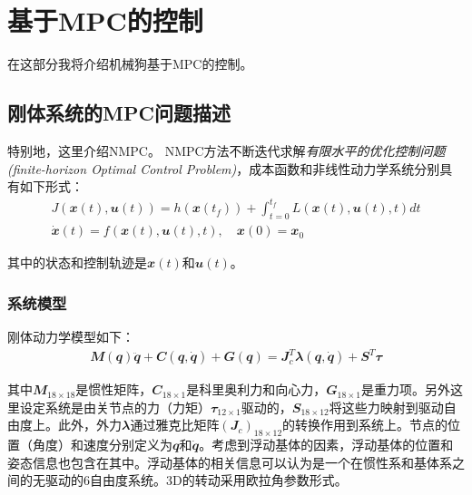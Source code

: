 
\chapter[基于MPC的控制]{基于MPC的控制}


在这部分我将介绍机械狗基于MPC的控制。

\section[刚体系统的MPC问题描述]{刚体系统的MPC问题描述\cite[p2-4]{Neunert_Stauble_Giftthaler_Bellicoso_Carius_Gehring_Hutter_Buchli_2018}}

特别地，这里介绍NMPC。
NMPC方法不断迭代求解\emph{有限水平的优化控制问题(finite-horizon Optimal Control Problem)}，成本函数和非线性动力学系统分别具有如下形式：
\begin{align}
    J(\mathbfit{x}(t), \mathbfit{u}(t))=h(\mathbfit{x}(t_f))+\int_{t=0}^{t_f}L(\mathbfit{x}(t), \mathbfit{u}(t),t)dt \label{function:cost_function}\\
    \mathbfit{\dot x}(t)=f(\mathbfit{x}(t), \mathbfit{u}(t),t), \quad \mathbfit{x}(0)= \mathbfit{x}_0\label{function:system_dynamics}
\end{align}

其中的状态和控制轨迹是$\mathbfit{x}(t)$和$\mathbfit{u}(t)$。

\subsection[系统模型]{系统模型}

刚体动力学模型如下：
\begin{align}
    \mathbfit{M}(\mathbfit{q})\mathbfit{\ddot q}+\mathbfit{C}(\mathbfit{q},\mathbfit{\dot q})+\mathbfit{G}(\mathbfit{q})=\mathbfit{J}_c^T\mathbfit{\lambda}(\mathbfit{q},\mathbfit{\dot q})+\mathbfit{S}^T\mathbfit{\tau}
\end{align}

其中$\mathbfit{M}_{18 \times 18}$是惯性矩阵，$\mathbfit{C}_{18 \times 1}$是科里奥利力和向心力，$\mathbfit{G}_{18 \times 1}$是重力项。另外这里设定系统是由关节点的力（力矩）$\mathbfit{\tau}_{12\times 1}$驱动的，$\mathbfit{S}_{18\times 12}$将这些力映射到驱动自由度上。此外，外力$\mathbfit{\lambda}$通过雅克比矩阵$(\mathbfit{J}_c)_{18\times 12}$的转换作用到系统上。节点的位置（角度）和速度分别定义为$\mathbfit{q}$和$\mathbfit{\dot q}$。考虑到浮动基体的因素，浮动基体的位置和姿态信息也包含在其中。浮动基体的相关信息可以认为是一个在惯性系和基体系之间的无驱动的$6$自由度系统。3D的转动采用欧拉角参数形式。

